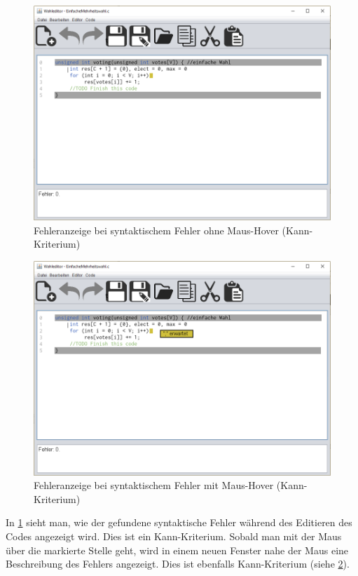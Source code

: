 \documentclass[a4paper]{scrreprt}
\begin{document}
\begin{figure}[H]
\includegraphics[scale=0.4]{Editor-mit-Fehler-ohne-hover.png}
\caption{Fehleranzeige bei syntaktischem Fehler ohne Maus-Hover (Kann-Kriterium)}
\label{Editor-mit-Fehler-ohne-hover}
\end{figure}

\begin{figure}[H]
\includegraphics[scale=0.4]{Editor-mit-Fehler-mit-hover.png}
\caption{Fehleranzeige bei syntaktischem Fehler mit Maus-Hover (Kann-Kriterium)}
\label{Editor-mit-Fehler-mit-hover}
\end{figure}

In \ref{Editor-mit-Fehler-ohne-hover} sieht man, wie der gefundene syntaktische Fehler während des Editieren des Codes angezeigt wird. Dies ist ein Kann-Kriterium. Sobald man mit der Maus über die markierte Stelle geht, wird in einem neuen Fenster nahe der Maus eine Beschreibung des Fehlers angezeigt. Dies ist ebenfalls Kann-Kriterium (siehe \ref{Editor-mit-Fehler-mit-hover}).
\end{document}
